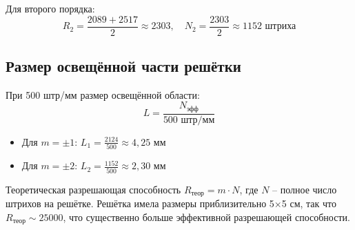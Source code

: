 \documentclass[12pt,a4paper]{article}
\begin{document}
Для второго порядка:
\begin{equation}
    R_2 = \frac{2089 + 2517}{2} \approx 2303, \quad 
    N_2 = \frac{2303}{2} \approx 1152 \text{ штриха}
\end{equation}

\subsection*{Размер освещённой части решётки}

При 500 штр/мм размер освещённой области:
\begin{equation}
    L = \frac{N_{\text{эфф}}}{500 \text{ штр/мм}}
\end{equation}

\begin{itemize}
    \item Для $m = \pm 1$: $L_1 = \frac{2124}{500} \approx 4{,}25$ мм
    \item Для $m = \pm 2$: $L_2 = \frac{1152}{500} \approx 2{,}30$ мм
\end{itemize}


Теоретическая разрешающая способность $R_{\text{теор}} = m \cdot N$, где $N$ -- полное число штрихов на решётке. Решётка имела размеры приблизительно 5$\times$5 см, так что $R_{\text{теор}} \sim 25000$, что существенно больше эффективной разрешающей способности.



\end{document}
